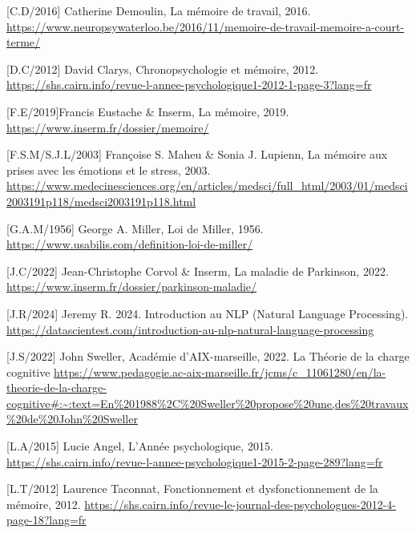 \documentclass[11pt,a4paper]{report}
\begin{document}
\begin{thebibliography}{9}

        [C.D/2016] Catherine Demoulin, La mémoire de travail, 2016. \break
        \url{https://www.neuropsywaterloo.be/2016/11/memoire-de-travail-memoire-a-court-terme/}
    
        [D.C/2012]  David Clarys, Chronopsychologie et mémoire, 2012. \break
        \url{https://shs.cairn.info/revue-l-annee-psychologique1-2012-1-page-3?lang=fr}

        [F.E/2019]Francis Eustache \& Inserm, La mémoire, 2019. \break
        \url{https://www.inserm.fr/dossier/memoire/}

        [F.S.M/S.J.L/2003] Françoise S. Maheu \& Sonia J. Lupienn, La mémoire aux prises avec les émotions et le stress, 2003. \break
        \url{https://www.medecinesciences.org/en/articles/medsci/full_html/2003/01/medsci2003191p118/medsci2003191p118.html}

        [G.A.M/1956] George A. Miller, Loi de Miller, 1956. \break
        \url{https://www.usabilis.com/definition-loi-de-miller/}
    
        [J.C/2022] Jean-Christophe Corvol \& Inserm, La maladie de Parkinson, 2022. \break
        \url{https://www.inserm.fr/dossier/parkinson-maladie/}
    
        [J.R/2024] Jeremy R. 2024. Introduction au NLP (Natural Language Processing). \break
        \url{https://datascientest.com/introduction-au-nlp-natural-language-processing}
    
        [J.S/2022] John Sweller, Académie d'AIX-marseille, 2022. La Théorie de la charge cognitive \break
        \url{https://www.pedagogie.ac-aix-marseille.fr/jcms/c_11061280/en/la-theorie-de-la-charge-cognitive#:~:text=En%201988%2C%20Sweller%20propose%20une,des%20travaux%20de%20John%20Sweller}
    
        [L.A/2015] Lucie Angel, L'Année psychologique, 2015. \break
        \url{https://shs.cairn.info/revue-l-annee-psychologique1-2015-2-page-289?lang=fr}
    
        [L.T/2012] Laurence Taconnat, Fonctionnement et dysfonctionnement de la mémoire, 2012. \break
        \url{https://shs.cairn.info/revue-le-journal-des-psychologues-2012-4-page-18?lang=fr}
    

\end{thebibliography}
\end{document}

